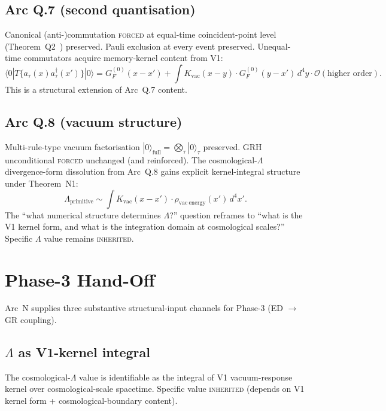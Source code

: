 \documentclass[11pt,a4paper]{article}
\begin{document}
\subsection{Arc Q.7 (second quantisation)}

Canonical (anti-)commutation \textsc{forced} at equal-time coincident-point level (Theorem~Q2~\cite{arcq}) preserved. Pauli exclusion at every event preserved. Unequal-time commutators acquire memory-kernel content from V1:
\begin{equation}
\langle 0 | T\{a_\tau(x) a^\dagger_\tau(x')\} | 0 \rangle = G_F^{(0)}(x - x') + \int K_\mathrm{vac}(x - y) \cdot G_F^{(0)}(y - x') \, d^4 y \cdot \mathcal{O}(\text{higher order}).
\end{equation}
This is a structural extension of Arc~Q.7 content.

\subsection{Arc Q.8 (vacuum structure)}

Multi-rule-type vacuum factorisation $|0\rangle_\mathrm{full} = \bigotimes_\tau |0\rangle_\tau$ preserved. GRH unconditional \textsc{forced} unchanged (and reinforced). The cosmological-$\Lambda$ divergence-form dissolution from Arc~Q.8 gains explicit kernel-integral structure under Theorem~N1:
\begin{equation}
\Lambda_\mathrm{primitive} \sim \int K_\mathrm{vac}(x - x') \cdot \rho_\mathrm{vac\ energy}(x') \, d^4 x'.
\end{equation}
The ``what numerical structure determines $\Lambda$?'' question reframes to ``what is the V1 kernel form, and what is the integration domain at cosmological scales?'' Specific $\Lambda$ value remains \textsc{inherited}.

\section{Phase-3 Hand-Off}

Arc~N supplies three substantive structural-input channels for Phase-3 (ED $\to$ GR coupling).

\subsection{$\Lambda$ as V1-kernel integral}

The cosmological-$\Lambda$ value is identifiable as the integral of V1 vacuum-response kernel over cosmological-scale spacetime. Specific value \textsc{inherited} (depends on V1 kernel form + cosmological-boundary content).
\end{document}
